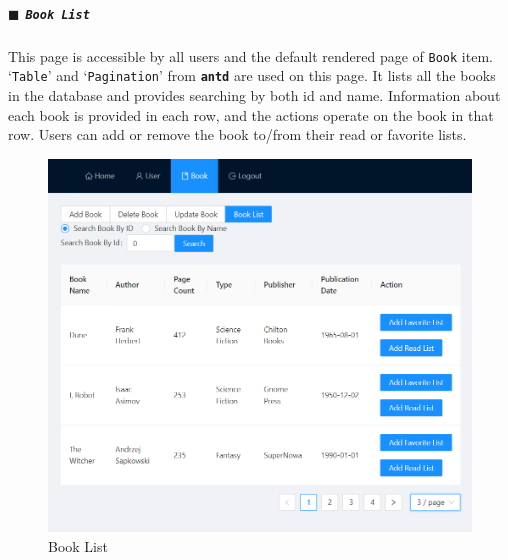 \subparagraph{\texorpdfstring{$\blacksquare$}{-} \texttt{Book List}}

This page is accessible by all users and the default rendered page of \texttt{Book} item. `\texttt{Table}' and `\texttt{Pagination}' from \textbf{\texttt{antd}} are used on this page. It lists all the books in the database and provides searching by both id and name. Information about each book is provided in each row, and the actions operate on the book in that row. Users can add or remove the book to/from their read or favorite lists.

\begin{minipage}{.49\textwidth}
  \begin{figure}[H]
    \centering
    \includegraphics[width=\linewidth]{img/front-end/book-list.png}
    \caption{Book List}
  \end{figure}
\end{minipage}
